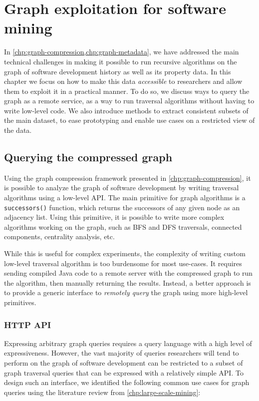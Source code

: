 \chapter{Graph exploitation for software mining}%
\label{chp:graph-exploitation}

In \cref{chp:graph-compression,chp:graph-metadata}, we have addressed the main
technical challenges in making it possible to run recursive algorithms on the
graph of software development history as well as its property data. In this
chapter we focus on how to make this data \emph{accessible} to researchers and
allow them to exploit it in a practical manner. To do so, we discuss ways to
query the graph as a remote service, as a way to run traversal algorithms
without having to write low-level code. We also introduce methods to extract
consistent subsets of the main dataset, to ease prototyping and enable use
cases on a restricted view of the data.

\section{Querying the compressed graph}
\label{sec:graph-querying}

Using the graph compression framework presented in
\cref{chp:graph-compression}, it is possible to analyze the graph of software
development by writing traversal algorithms using a low-level API\@. The main
primitive for graph algorithms is a \texttt{successors()} function, which
returns the successors of any given node as an adjacency list. Using this
primitive, it is possible to write more complex algorithms working on the
graph, such as \gls{BFS} and \gls{DFS} traversals, connected components,
centrality analysis, etc.

While this is useful for complex experiments, the complexity of writing custom
low-level traversal algorithm is too burdensome for most use-cases. It
requires sending compiled Java code to a remote server with the compressed
graph to run the algorithm, then manually returning the results. Instead, a
better approach is to provide a generic interface to \emph{remotely query} the
graph using more high-level primitives.

\subsection{HTTP API}

Expressing arbitrary graph queries requires a query language with a high level
of expressiveness. However, the vast majority of queries researchers will tend
to perform on the graph of software development can be restricted to a subset
of graph traversal queries that can be expressed with a relatively simple
API\@. To design such an interface, we identified the following common use
cases for graph queries using the literature review from
\cref{chp:large-scale-mining}:

